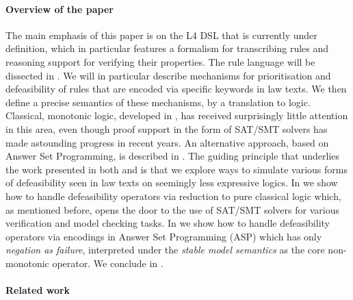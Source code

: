 
\paragraph{Overview of the paper}
The main emphasis of this paper is on the L4 DSL that is currently under
definition, which in particular features a formalism for transcribing rules
and reasoning support for verifying their properties.
The rule language will be dissected in
. We will in particular describe mechanisms
for prioritisation and defeasibility of rules that are encoded via specific
keywords in law texts. We then define a precise semantics of these mechanisms,
by a translation to logic. Classical, monotonic logic, developed in
, has received surprisingly little attention
in this area, even though proof support in the form of SAT/SMT solvers has
made astounding progress in recent years. An alternative approach, based on
Answer Set Programming, is described in
.  The guiding principle
that underlies the work presented in both 
and  is that we explore ways to simulate various
forms of defeasibility seen in law texts on seemingly less expressive
logics. In  we show how to handle
defeasibility operators via reduction to pure classical logic which, as
mentioned before, opens the door to the use of SAT/SMT solvers for various
verification and model checking tasks. In  we show
how to handle defeasibility operators via encodings in Answer Set Programming
(ASP) which has only \emph{negation as failure}, interpreted under the
\emph{stable model semantics} as the core non-monotonic operator. We conclude
in .


\paragraph{Related work}

